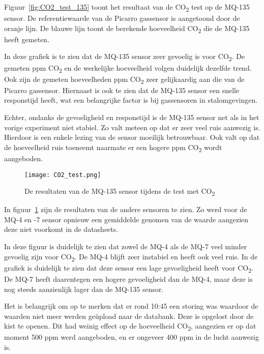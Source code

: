 Figuur~\ref{fig:CO2_test_135} toont het resultaat van de CO\textsubscript{2} test op de MQ-135 sensor. De referentiewaarde van de Picarro gassensor is aangetoond door de oranje lijn. De blauwe lijn toont de berekende hoeveelheid CO\textsubscript{2} die de MQ-135 heeft gemeten.

In deze grafiek is te zien dat de MQ-135 sensor zeer gevoelig is voor CO\textsubscript{2}. De gemeten ppm CO\textsubscript{2} en de werkelijke hoeveelheid volgen duidelijk dezelfde trend. Ook zijn de gemeten hoeveelheden ppm CO\textsubscript{2} zeer gelijkaardig aan die van de Picarro gassensor. Hiernaast is ook te zien dat de MQ-135 sensor een snelle responstijd heeft, wat een belangrijke factor is bij gassensoren in stalomgevingen.

Echter, ondanks de gevoeligheid en responstijd is de MQ-135 sensor net als in het vorige experiment niet stabiel. Zo valt meteen op dat er zeer veel ruis aanwezig is. Hierdoor is een enkele lezing van de sensor moeilijk betrouwbaar. Ook valt op dat de hoeveelheid ruis toeneemt naarmate er een hogere ppm CO\textsubscript{2} wordt aangeboden.

\pagebreak

\begin{figure}[h!]
    \texttt{[image: CO2\_test.png]}
    \caption[Test met CO2 (MQ135)]{De resultaten van de MQ-135 sensor tijdens de test met CO\textsubscript{2}}
    \label{fig:CO2_test}
\end{figure}


In figuur~\ref{fig:CO2_test} zijn de resultaten van de andere sensoren te zien. Zo werd voor de MQ-4 en -7 sensor opnieuw een gemiddelde genomen van de waarde aangezien deze niet voorkomt in de datasheets.

In deze figuur is duidelijk te zien dat zowel de MQ-4 als de MQ-7 veel minder gevoelig zijn voor CO\textsubscript{2}. De MQ-4 blijft zeer instabiel en heeft ook veel ruis. In de grafiek is duidelijk te zien dat deze sensor een lage gevoeligheid heeft voor CO\textsubscript{2}. De MQ-7 heeft daarentegen een hogere gevoeligheid dan de MQ-4, maar deze is nog steeds aanzienlijk lager dan de MQ-135 sensor.

Het is belangrijk om op te merken dat er rond 10:45 een storing was waardoor de waarden niet meer werden geüpload naar de databank. Deze is opgelost door de kist te openen. Dit had weinig effect op de hoeveelheid CO\textsubscript{2}, aangezien er op dat moment 500 ppm werd aangeboden, en er ongeveer 400 ppm in de lucht aanwezig is. 


